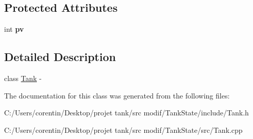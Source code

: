 \subsection*{Protected Attributes}
\begin{DoxyCompactItemize}
\item 
\mbox{\label{classstate_1_1_tank_acfb1b29669978895d80ebedcc661ba52}} 
int {\bfseries pv}
\end{DoxyCompactItemize}


\subsection{Detailed Description}
class \hyperlink{classstate_1_1_tank}{Tank} -\/ 

The documentation for this class was generated from the following files\+:\begin{DoxyCompactItemize}
\item 
C\+:/\+Users/corentin/\+Desktop/projet tank/src modif/\+Tank\+State/include/Tank.\+h\item 
C\+:/\+Users/corentin/\+Desktop/projet tank/src modif/\+Tank\+State/src/Tank.\+cpp\end{DoxyCompactItemize}
